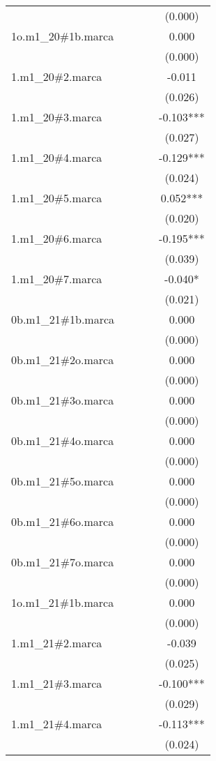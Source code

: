 \begin{tabular}{lcccc}
 &  &  &  & (0.000) \\
1o.m1\_20\#1b.marca &  &  &  & 0.000 \\
 &  &  &  & (0.000) \\
1.m1\_20\#2.marca &  &  &  & -0.011 \\
 &  &  &  & (0.026) \\
1.m1\_20\#3.marca &  &  &  & -0.103*** \\
 &  &  &  & (0.027) \\
1.m1\_20\#4.marca &  &  &  & -0.129*** \\
 &  &  &  & (0.024) \\
1.m1\_20\#5.marca &  &  &  & 0.052*** \\
 &  &  &  & (0.020) \\
1.m1\_20\#6.marca &  &  &  & -0.195*** \\
 &  &  &  & (0.039) \\
1.m1\_20\#7.marca &  &  &  & -0.040* \\
 &  &  &  & (0.021) \\
0b.m1\_21\#1b.marca &  &  &  & 0.000 \\
 &  &  &  & (0.000) \\
0b.m1\_21\#2o.marca &  &  &  & 0.000 \\
 &  &  &  & (0.000) \\
0b.m1\_21\#3o.marca &  &  &  & 0.000 \\
 &  &  &  & (0.000) \\
0b.m1\_21\#4o.marca &  &  &  & 0.000 \\
 &  &  &  & (0.000) \\
0b.m1\_21\#5o.marca &  &  &  & 0.000 \\
 &  &  &  & (0.000) \\
0b.m1\_21\#6o.marca &  &  &  & 0.000 \\
 &  &  &  & (0.000) \\
0b.m1\_21\#7o.marca &  &  &  & 0.000 \\
 &  &  &  & (0.000) \\
1o.m1\_21\#1b.marca &  &  &  & 0.000 \\
 &  &  &  & (0.000) \\
1.m1\_21\#2.marca &  &  &  & -0.039 \\
 &  &  &  & (0.025) \\
1.m1\_21\#3.marca &  &  &  & -0.100*** \\
 &  &  &  & (0.029) \\
1.m1\_21\#4.marca &  &  &  & -0.113*** \\
 &  &  &  & (0.024) \\

\end{tabular}
